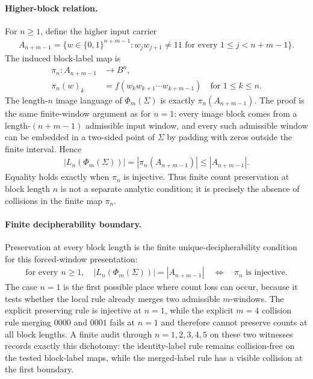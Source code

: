 \paragraph{Higher-block relation.}
For $n\geq 1$, define the higher input carrier
$$
\begin{aligned}
A_{n+m-1} = \{ w \in \{0,1\}^{n+m-1} : w_j w_{j+1}\neq 11 \text{ for every } 1\leq j<n+m-1 \}.
\end{aligned}
$$
The induced block-label map is
$$
\begin{aligned}
\pi_n : A_{n+m-1} &\longrightarrow B^n,\\
\pi_n(w)_k &= f(w_k w_{k+1}\cdots w_{k+m-1}) \quad \text{for } 1\leq k\leq n.
\end{aligned}
$$
The length-$n$ image language of $\Phi_m(\Sigma)$ is exactly $\pi_n(A_{n+m-1})$. The proof is the same finite-window argument as for $n=1$: every image block comes from a length-$(n+m-1)$ admissible input window, and every such admissible window can be embedded in a two-sided point of $\Sigma$ by padding with zeros outside the finite interval. Hence
$$
\begin{aligned}
|L_n(\Phi_m(\Sigma))|=|\pi_n(A_{n+m-1})|\leq |A_{n+m-1}|.
\end{aligned}
$$
Equality holds exactly when $\pi_n$ is injective. Thus finite count preservation at block length $n$ is not a separate analytic condition; it is precisely the absence of collisions in the finite map $\pi_n$.

\paragraph{Finite decipherability boundary.}
Preservation at every block length is the finite unique-decipherability condition for this forced-window presentation:
$$
\begin{aligned}
\text{for every } n\geq 1,\quad |L_n(\Phi_m(\Sigma))|=|A_{n+m-1}| \quad \Longleftrightarrow \quad \pi_n \text{ is injective}.
\end{aligned}
$$
The case $n=1$ is the first possible place where count loss can occur, because it tests whether the local rule already merges two admissible $m$-windows. The explicit preserving rule is injective at $n=1$, while the explicit $m=4$ collision rule merging $0000$ and $0001$ fails at $n=1$ and therefore cannot preserve counts at all block lengths. A finite audit through $n=1,2,3,4,5$ on these two witnesses records exactly this dichotomy: the identity-label rule remains collision-free on the tested block-label maps, while the merged-label rule has a visible collision at the first boundary.

